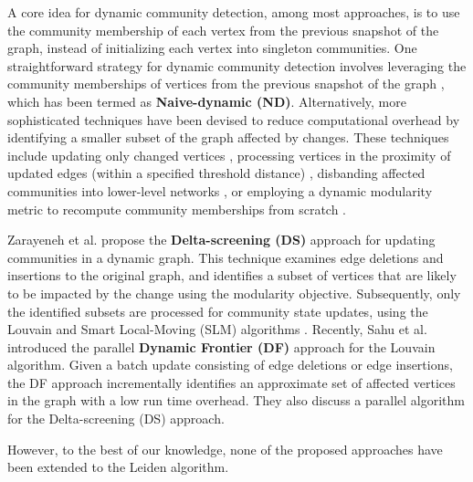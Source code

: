 A core idea for dynamic community detection, among most approaches, is to use the community membership of each vertex from the previous snapshot of the graph, instead of initializing each vertex into singleton communities. One straightforward strategy for dynamic community detection involves leveraging the community memberships of vertices from the previous snapshot of the graph \cite{com-aynaud10, com-chong13, com-shang14, com-zhuang19}, which has been termed as \textbf{Naive-dynamic (ND)}. Alternatively, more sophisticated techniques have been devised to reduce computational overhead by identifying a smaller subset of the graph affected by changes. These techniques include updating only changed vertices \cite{com-aktunc15, com-yin16}, processing vertices in the proximity of updated edges (within a specified threshold distance) \cite{com-held16}, disbanding affected communities into lower-level networks \cite{com-cordeiro16}, or employing a dynamic modularity metric to recompute community memberships from scratch \cite{com-meng16}.

Zarayeneh et al. \cite{com-zarayeneh21} propose the \textbf{Delta-screening (DS)} approach for updating communities in a dynamic graph. This technique examines edge deletions and insertions to the original graph, and identifies a subset of vertices that are likely to be impacted by the change using the modularity objective. Subsequently, only the identified subsets are processed for community state updates, using the Louvain and Smart Local-Moving (SLM) algorithms \cite{com-waltman13}. Recently, Sahu et al. \cite{sahu2024shared} introduced the parallel \textbf{Dynamic Frontier (DF)} approach for the Louvain algorithm. Given a batch update consisting of edge deletions or edge insertions, the DF approach incrementally identifies an approximate set of affected vertices in the graph with a low run time overhead. They also discuss a parallel algorithm for the Delta-screening (DS) approach.

However, to the best of our knowledge, none of the proposed approaches have been extended to the Leiden algorithm.
